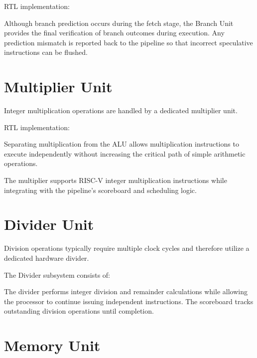 RTL implementation:

\begin{center}
\end{center}

Although branch prediction occurs during the fetch stage, the Branch Unit provides the final
verification of branch outcomes during execution. Any prediction mismatch is reported back to
the pipeline so that incorrect speculative instructions can be flushed.

\section{Multiplier Unit}

Integer multiplication operations are handled by a dedicated multiplier unit.

RTL implementation:

\begin{center}
\end{center}

Separating multiplication from the ALU allows multiplication instructions to execute
independently without increasing the critical path of simple arithmetic operations.

The multiplier supports RISC-V integer multiplication instructions while integrating with the
pipeline's scoreboard and scheduling logic.

\section{Divider Unit}

Division operations typically require multiple clock cycles and therefore utilize a dedicated
hardware divider.

The Divider subsystem consists of:

\begin{rtlrefs}
\end{rtlrefs}

The divider performs integer division and remainder calculations while allowing the processor to
continue issuing independent instructions. The scoreboard tracks outstanding division
operations until completion.

\section{Memory Unit}


